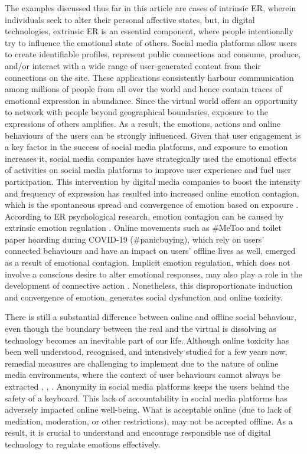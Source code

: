   
The examples discussed thus far in this article are cases of intrinsic ER, wherein individuals seek to alter their personal affective states, but, in digital technologies, extrinsic ER is an essential component, where people intentionally try to influence the emotional state of others. Social media platforms allow users to create identifiable profiles, represent public connections and consume, produce, and/or interact with a wide range of user-generated content from their connections on the site. These applications consistently harbour communication among millions of people from all over the world and hence contain traces of emotional expression in abundance. Since the virtual world offers an opportunity to network with people beyond geographical boundaries, exposure to the expressions of others amplifies. As a result, the emotions, actions and online behaviours of the users can be strongly influenced. Given that user engagement is a key factor in the success of social media platforms, and exposure to emotion increases it, social media companies have strategically used the emotional effects of activities on social media platforms to improve user experience and fuel user participation. This intervention by digital media companies to boost the intensity and frequency of expression has resulted into increased online emotion contagion, which is the spontaneous spread and convergence of emotion based on exposure \cite{goldenberg2020digital}. According to ER psychological research, emotion contagion can be caused by extrinsic emotion regulation \cite{elfenbein2014many}. Online movements such as \#MeToo and toilet paper hoarding during COVID-19 (\#panicbuying), which rely on users' connected behaviours and have an impact on users' offline lives as well, emerged as a result of emotional contagion. Implicit emotion regulation, which does not involve a conscious desire to alter emotional responses, may also play a role in the development of connective action \cite{mirbabaie2021development}. Nonetheless, this disproportionate induction and convergence of emotion, generates social dysfunction and online toxicity.


There is still a substantial difference between online and offline social behaviour, even though the boundary between the real and the virtual is dissolving as technology becomes an inevitable part of our life. Although online toxicity has been well understood, recognised, and intensively studied for a few years now, remedial measures are challenging to implement due to the nature of online media environments, where the context of user behaviours cannot always be extracted \cite{slovak2022designing}, \cite{tag2022emotion}, \cite{thomas2022s}. Anonymity in social media platforms keeps the users behind the safety of a keyboard. This lack of accountability in social media platforms has adversely impacted online well-being. What is acceptable online (due to lack of mediation, moderation, or other restrictions), may not be accepted offline. As a result, it is crucial to understand and encourage responsible use of digital technology to regulate emotions effectively.


